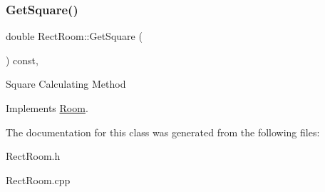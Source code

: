 \subsubsection{\texorpdfstring{Get\+Square()}{GetSquare()}}
{\footnotesize\ttfamily double Rect\+Room\+::\+Get\+Square (\begin{DoxyParamCaption}{ }\end{DoxyParamCaption}) const\hspace{0.3cm}{\ttfamily [override]}, {\ttfamily [virtual]}}

Square Calculating Method 

Implements \mbox{\hyperlink{class_room_a031b559260949b3fa9e27053aaf602f5}{Room}}.



The documentation for this class was generated from the following files\+:\begin{DoxyCompactItemize}
\item 
Rect\+Room.\+h\item 
Rect\+Room.\+cpp\end{DoxyCompactItemize}
